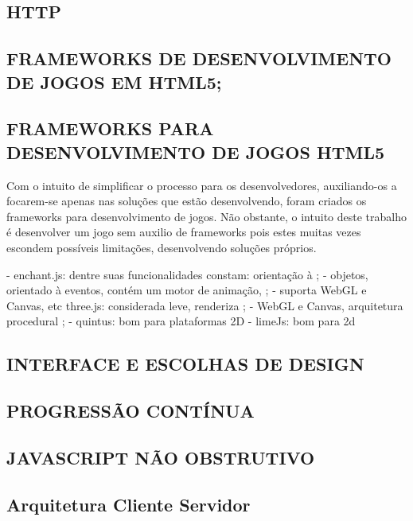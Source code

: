 \documentclass[11pt,a4paper]{article}
\begin{document}
\subsection{ HTTP}

\subsection{FRAMEWORKS DE DESENVOLVIMENTO DE JOGOS EM HTML5;}


\subsection{ FRAMEWORKS PARA DESENVOLVIMENTO DE JOGOS HTML5}
Com o intuito de simplificar o processo para os desenvolvedores,
auxiliando-os a focarem-se apenas nas soluções que estão
desenvolvendo, foram criados os frameworks para desenvolvimento de
jogos. Não obstante, o intuito deste trabalho é desenvolver um jogo
sem auxilio de frameworks pois estes muitas vezes escondem possíveis
limitações, desenvolvendo soluções próprios.

- enchant.js: dentre suas funcionalidades constam: orientação à     ;
- objetos, orientado à eventos, contém um motor de animação,       ;
- suporta WebGL e Canvas, etc three.js: considerada leve, renderiza    ;
- WebGL e Canvas, arquitetura procedural                               ;
- quintus: bom para plataformas 2D
- limeJs: bom para 2d

\subsection{ INTERFACE E ESCOLHAS DE DESIGN}

\subsection{PROGRESSÃO CONTÍNUA}

\subsection{JAVASCRIPT NÃO OBSTRUTIVO}

\subsection{Arquitetura Cliente Servidor}
\end{document}
